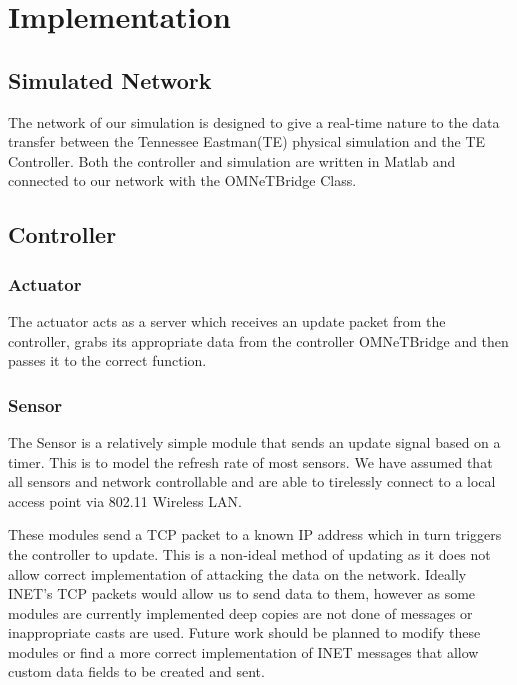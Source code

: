 \section{Implementation}
\subsection{Simulated Network}

The network of our simulation is designed to give a real-time nature to the data transfer between the Tennessee Eastman(TE) physical simulation and the TE Controller. Both the controller and simulation are written in Matlab and connected to our network with the OMNeTBridge Class. 


\subsection{Controller}



\subsubsection{Actuator}

The actuator acts as a server which receives an update packet from the controller, grabs its appropriate data from the controller OMNeTBridge and then passes it to the correct function. 

\subsubsection{Sensor}


The Sensor is a relatively simple module that sends an update signal based on a timer. This is to model the refresh rate of most sensors. We have assumed that all sensors and network controllable and are able to tirelessly connect to a local access point via 802.11 Wireless LAN. 

These modules send a TCP packet to a known IP address which in turn triggers the controller to update. This is a non-ideal method of updating as it does not allow correct implementation of attacking the data on the network. Ideally INET's TCP packets would allow us to send data to them, however as some modules are currently implemented deep copies are not done of messages or inappropriate casts are used. Future work should be planned to modify these modules or find a more correct
implementation of INET messages that allow custom data fields to be created and sent. 


